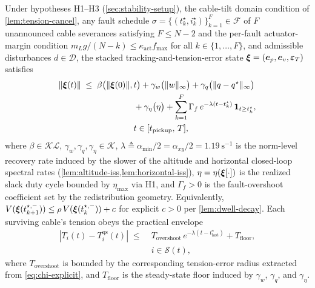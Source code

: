 \begin{theorem}
\label{thm:hybrid-stability}
Under hypotheses H1--H3 (\cref{sec:stability-setup}), the
cable-tilt domain condition of \cref{lem:tension-cancel}, any
fault schedule $\sigma = \{(t_k^\star, i_k^\star)\}_{k=1}^{F}
\in \mathcal{F}$ of $F$ unannounced cable severances satisfying
$F \le N - 2$ and the per-fault actuator-margin condition
$m_L g/(N{-}k) \le \kappa_{\mathrm{act}} f_{\max}$ for all
$k \in \{1,\dots,F\}$, and admissible disturbances
$d \in \mathcal{D}$, the stacked tracking-and-tension-error
state $\boldsymbol{\xi} = (\boldsymbol{e}_p, \boldsymbol{e}_v, \boldsymbol{\varepsilon}_T)$
satisfies
\begin{align}
\label{eq:iss-envelope-explicit}
  \|\boldsymbol{\xi}(t)\|
    \;\le\;
      \beta\bigl(\|\boldsymbol{\xi}(0)\|,\,&t\bigr)
      + \gamma_w\bigl(\|w\|_\infty\bigr)
      + \gamma_q\bigl(\|q - q^\star\|_\infty\bigr)
      \notag \\
    &+ \gamma_\eta\bigl(\eta\bigr)
      + \sum_{k=1}^{F}
           \Gamma_f\,e^{-\lambda(t - t_k^\star)}\,
           \mathbf{1}_{t \ge t_k^\star},\nonumber\\
    &t \in [t_{\mathrm{pickup}},\, T],
\end{align}
where $\beta \in \mathcal{KL}$, $\gamma_w, \gamma_q,
\gamma_\eta \in \mathcal{K}$, $\lambda \triangleq
\alpha_{\min}/2 = \alpha_{xy}/2 = \SI{1.19}{\second^{-1}}$
is the norm-level recovery rate induced by the slower of the
altitude and horizontal closed-loop spectral rates
(\cref{lem:altitude-iss,lem:horizontal-iss}), $\eta =
\eta(\boldsymbol{\xi}[\cdot])$ is the realized slack duty cycle bounded
by $\eta_{\max}$ via H1, and $\Gamma_f > 0$ is the
fault-overshoot coefficient set by the redistribution geometry.
Equivalently, $V(\boldsymbol{\xi}(t_{k+1}^{\star,-})) \le
\rho\,V(\boldsymbol{\xi}(t_k^{\star,-})) + c$ for explicit $c > 0$
per \cref{lem:dwell-decay}. Each surviving cable's tension
obeys the practical envelope
\begin{align}
\label{eq:tension-envelope-thm}
  |T_i(t) - T_i^{\mathrm{qs}}(t)|
    \;\le\;
    &T_{\mathrm{overshoot}}\,
    e^{-\lambda(t - t^\star_{\mathrm{last}})}
    + T_{\mathrm{floor}},\\ 
    &i \in \mathcal{S}(t),\nonumber
\end{align}
where $T_{\mathrm{overshoot}}$ is bounded by the corresponding
tension-error radius extracted from \eqref{eq:chi-explicit},
and $T_{\mathrm{floor}}$ is the steady-state floor induced by
$\gamma_w$, $\gamma_q$, and $\gamma_\eta$.
\end{theorem}

